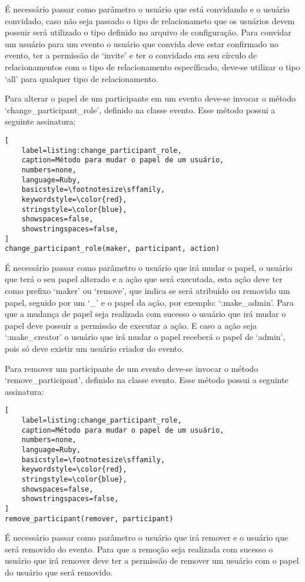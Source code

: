 É necessário passar como parâmetro o usuário que está convidando e o usuário convidado, caso não seja passado o tipo de relacionameto que os usuários devem possuir será utilizado o tipo definido no arquivo de configuração. Para convidar um usuário para um evento o usuário que convida deve estar confirmado no evento, ter a permissão de `invite' e ter o convidado em seu círculo de relacionamentos com o tipo de relacionamento específicado, deve-se utilizar o tipo `all' para qualquer tipo de relacionamento.

Para alterar o papel de um participante em um evento deve-se invocar o método `change\_participant\_role', definido na classe evento. Esse método possui a seguinte assinatura:

\begin{lstlisting}[
    label=listing:change_participant_role,
    caption=Método para mudar o papel de um usuário,
    numbers=none,
    language=Ruby,
    basicstyle=\footnotesize\sffamily,
    keywordstyle=\color{red},
    stringstyle=\color{blue},
    showspaces=false,
    showstringspaces=false,
]
change_participant_role(maker, participant, action)
\end{lstlisting}

É necessário passar como parâmetro o usuário que irá mudar o papel, o usuário que terá o seu papel alterado e a ação que será executada, esta ação deve ter como prefixo `maker' ou `remove', que indica se será atribuido ou removido um papel, seguido por um `\_' e o papel da ação, por exemplo: `:make\_admin'. Para que a mudança de papel seja realizada com sucesso o usuário que irá mudar o papel deve possuir a permissão de executar a ação. E caso a ação seja `:make\_creator' o usuário que irá mudar o papel receberá o papel de `admin', pois só deve existir um usuário criador do evento.

Para remover um participante de um evento deve-se invocar o método `remove\_participant', definido na classe evento. Esse método possui a seguinte assinatura:

\begin{lstlisting}[
    label=listing:change_participant_role,
    caption=Método para mudar o papel de um usuário,
    numbers=none,
    language=Ruby,
    basicstyle=\footnotesize\sffamily,
    keywordstyle=\color{red},
    stringstyle=\color{blue},
    showspaces=false,
    showstringspaces=false,
]
remove_participant(remover, participant)
\end{lstlisting}

É necessário passar como parâmetro o usuário que irá remover e o usuário que será removido do evento. Para que a remoção seja realizada com sucesso o usuário que irá remover deve ter a permissão de remover um usuário com o papel do usuário que será removido.

